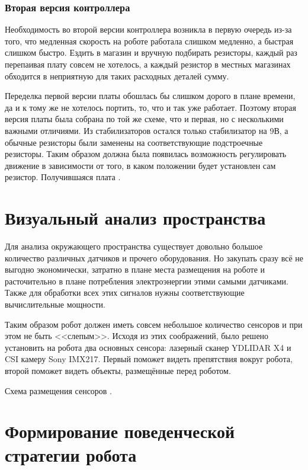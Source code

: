 \subsubsection{Вторая версия контроллера}

Необходимость во второй версии контроллера возникла в первую очередь из-за того, что медленная скорость на роботе работала слишком медленно, а быстрая слишком быстро. Ездить в магазин и вручную подбирать резисторы, каждый раз перепаивая плату совсем не хотелось, а каждый резистор в местных магазинах обходится в неприятную для таких расходных деталей сумму. 

Переделка первой версии платы обошлась бы слишком дорого в плане времени, да и к тому же не хотелось портить, то, что и так уже работает. Поэтому вторая версия платы была собрана по той же схеме, что и первая, но с несколькими важными отличиями. Из стабилизаторов остался только стабилизатор на 9В, а обычные резисторы были заменены на соответствующие подстроечные резисторы. Таким образом должна была появилась возможность регулировать движение в зависимости от того, в каком положении будет установлен сам резистор. Получившаяся плата .

\section{Визуальный анализ пространства}
Для анализа окружающего пространства существует довольно большое количество различных датчиков и прочего оборудования. Но закупать сразу всё не выгодно экономически, затратно в плане места размещения на роботе и расточительно в плане потребления электроэнергии этими самыми датчиками. Также для обработки всех этих сигналов нужны соответствующие вычислительные мощности. 

Таким образом робот должен иметь совсем небольшое количество сенсоров и при этом не быть <<слепым>>. Исходя из этих соображений, было решено установить на робота два основных сенсора: лазерный сканер YDLIDAR X4 и CSI камеру Sony IMX217. Первый поможет видеть препятствия вокруг робота, второй поможет видеть объекты, размещённые перед роботом. 

Схема размещения сенсоров .

\section{Формирование поведенческой стратегии робота}

